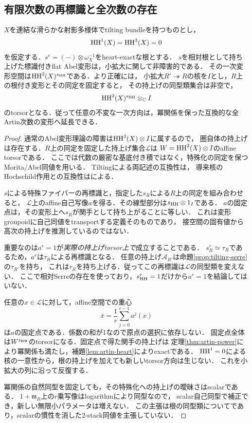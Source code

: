 \subsection{有限次数の再標識と全次数の存在}
\begin{theorem}[根を持つArtin変形の形式的滑らかさ]\label{thm:formal-roots}
$X$を連結な滑らかな射影多様体でtilting bundleを持つものとし，
\[
 \operatorname{HH}^1(X)=\operatorname{HH}^3(X)=0
\]
を仮定する．$s^r=(-)\otimes\omega_X^{-1}$をheart-exactな根とする．
$s$を相対根として持ち上げた標識付きflat Abel変形は，小拡大に関して非障害的である．
その一次変形空間は$\operatorname{HH}^2(X)^{s_{\operatorname{HH}}}$である．より正確には，
小拡大$R'\twoheadrightarrow R$の核を$I$とし，$R$上の根付き変形とその同定を固定すると，
その持上げの同型類集合は非空で，
\[
 \operatorname{HH}^2(X)^{s_{\operatorname{HH}}}\otimes_{\mathbb C}I
\]
のtorsorとなる．従って任意の不変な一次方向は，冪関係を保った互換的な全Artin次数の変形へ延長できる．
\end{theorem}
\begin{proof}
通常のAbel変形理論の障害は$\operatorname{HH}^3(X)\otimes I$に属するので，
圏自体の持上げは存在する．$R$上の同定を固定した持上げ集合$\mathcal L$は
$W=\operatorname{HH}^2(X)\otimes I$のaffine torsorである\cite{LVdB,BW}．
ここでは代数の厳密な基底付き積ではなく，特殊化の同定を保つMorita/Abel同値を用いる．
Tiltingによる両記述の互換性は\cite[Theorem 3.18, Proposition 3.21]{BW}，
導来核のHochschild作用との互換性は\cite[Theorem 3.2, \S4.6]{KellerDIH}による．

$s$による特殊ファイバーの再標識と，指定した$s_R$による$R$上の同定を組み合わせると，
$\mathcal L$上のaffine自己写像$a$を得る．その線型部分は$s_{\operatorname{HH}}\otimes1_I$である．
$a$の固定点は，その変形上へ$s_R$が関手として持ち上がることに等しい．
これは変形groupoidに自己同値をtransportする定義そのものであり，
接空間の固有値から高次の持上げを推測しているのではない．

重要なのは$a^r=1$が\emph{実際の持上げtorsor上で}成立することである．
$s_R^r\simeq\tau_R$であるため，$a^r$は$\tau_R$による再標識となる．
任意の持上げ$\mathcal A_{R'}$は命題\ref{prop:tilting-serre}の$\tau_{R'}$を持ち，
これは$\tau_R$を持ち上げる．従ってこの再標識は$\mathcal L$の同型類を変えない．
ここで相対Serreの存在を使っており，$s_{\operatorname{HH}}^r=1$だけから$a^r=1$を結論してはいない．

任意の$x\in\mathcal L$に対して，affine空間での重心
\[
 \bar x=\frac1r\sum_{j=0}^{r-1}a^j(x)
\]
は$a$の固定点である．係数の和が1なので原点の選択に依存しない．
固定点全体は$W^{s_{\operatorname{HH}}}$のtorsorになる．固定点で得た関手の持上げは
定理\ref{thm:artin-power}により冪関係も満たし，補題\ref{lem:artin-heart}によりexactである．
$\operatorname{HH}^1=0$による核の一意性から，根の持上げを加えても新しいtorsor方向は生じない．
これを小拡大の列に沿って反復する．

冪関係の自然同型を固定しても，その特殊化への持上げの曖昧さはscalarである．
$1+\mathfrak m_R$上の$r$乗写像はlogarithmにより同型なので，
scalar自己同型で補正でき，新しい無限小パラメータは増えない．
この主張は根の同型類についてであり，scalarの慣性を消した2-stack同値を主張していない．
\end{proof}

